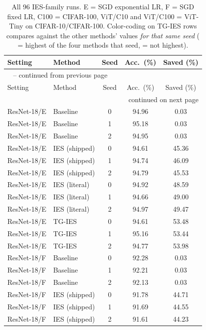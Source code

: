 \documentclass{article}
\newcommand{\win}[1]{\cellcolor{tgwin}#1}
\newcommand{\lose}[1]{\cellcolor{tglose}#1}
\theoremstyle{plain}
\theoremstyle{definition}
\theoremstyle{remark}
\begin{document}
\clearpage
\onecolumn
\begingroup
\small
\begin{longtable}{llccc}
\caption{All 96 IES-family runs. E = SGD exponential LR, F = SGD fixed LR, C100 = CIFAR-100, ViT/C10 and ViT/C100 = ViT-Tiny on CIFAR-10/CIFAR-100. Color-coding on TG-IES rows compares against the other methods' values \emph{for that same seed} (\win{} = highest of the four methods that seed, \lose{} = not highest).}
\label{tab:fullresults} \\
\toprule
Setting & Method & Seed & Acc.\ (\%) & Saved (\%) \\
\midrule
\endfirsthead
\multicolumn{5}{l}{\tablename~\thetable{} -- continued from previous page} \\
\toprule
Setting & Method & Seed & Acc.\ (\%) & Saved (\%) \\
\midrule
\endhead
\midrule
\multicolumn{5}{r}{continued on next page} \\
\endfoot
\bottomrule
\endlastfoot
ResNet-18/E & Baseline & 0 & 94.96 & 0.03 \\
ResNet-18/E & Baseline & 1 & 95.18 & 0.03 \\
ResNet-18/E & Baseline & 2 & 94.95 & 0.03 \\
ResNet-18/E & IES (shipped) & 0 & 94.61 & 45.36 \\
ResNet-18/E & IES (shipped) & 1 & 94.74 & 46.09 \\
ResNet-18/E & IES (shipped) & 2 & 94.79 & 45.53 \\
ResNet-18/E & IES (literal) & 0 & 94.92 & 48.59 \\
ResNet-18/E & IES (literal) & 1 & 94.66 & 49.00 \\
ResNet-18/E & IES (literal) & 2 & 94.97 & 49.47 \\
ResNet-18/E & TG-IES & 0 & \lose{94.61} & \win{53.48} \\
ResNet-18/E & TG-IES & 1 & \lose{95.16} & \win{53.44} \\
ResNet-18/E & TG-IES & 2 & \lose{94.77} & \win{53.98} \\
ResNet-18/F & Baseline & 0 & 92.28 & 0.03 \\
ResNet-18/F & Baseline & 1 & 92.21 & 0.03 \\
ResNet-18/F & Baseline & 2 & 92.13 & 0.03 \\
ResNet-18/F & IES (shipped) & 0 & 91.78 & 44.71 \\
ResNet-18/F & IES (shipped) & 1 & 91.69 & 44.55 \\
ResNet-18/F & IES (shipped) & 2 & 91.61 & 44.23 \\

\end{longtable}
\end{document}
